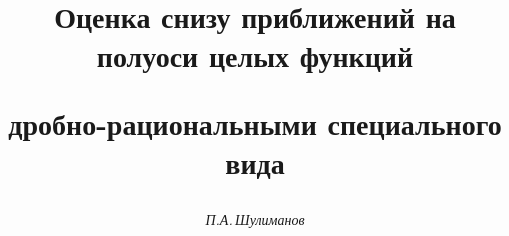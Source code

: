 

 


%  


 


\newcommand{\tts}[1]{} 


 




\setcounter{page}{59} 












 


\author{\it П.А.\,Шулиманов} 




\title{Оценка снизу приближений на полуоси целых функций  


дробно-рациональными специального вида} 


 


\date{} 




\pagestyle{plain} %


 




\maketitle 


\label{begin} 


 


